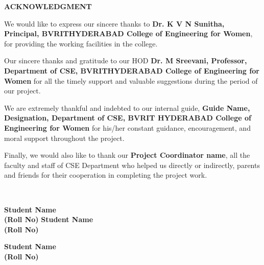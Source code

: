 {\centerline { {\large \textbf{ACKNOWLEDGMENT}}}}
\thispagestyle{empty}
\vspace*{1cm}

We would like to express our sincere thanks to \textbf{Dr. K V N Sunitha, Principal, BVRITHYDERABAD College of Engineering for Women}, for providing the working facilities in the college.

Our sincere thanks and gratitude to our HOD \textbf{Dr. M Sreevani, Professor, Department of CSE, BVRITHYDERABAD College of Engineering for Women} for all the timely support and valuable suggestions during the period of our project.

We are extremely thankful and indebted to our internal guide, \textbf{Guide Name, Designation, Department of CSE, BVRIT HYDERABAD College of Engineering for Women} for his/her constant guidance, encouragement, and moral support throughout the project.

Finally, we would also like to thank our \textbf{Project Coordinator name}, all the faculty and staff of CSE
Department who helped us directly or indirectly, parents and friends for their cooperation in
completing the project work.

\begin{minipage}{10cm}
~\\
\end{minipage}
\begin{minipage}{20cm}
\vskip 1cm
  \textbf{Student Name}\\
  \textbf{(Roll No)}
\vskip 2cm
    \textbf{Student Name}\\
  \textbf{(Roll No)}

  \vskip 2cm
    \textbf{Student Name}\\
  \textbf{(Roll No)}

\end{minipage}